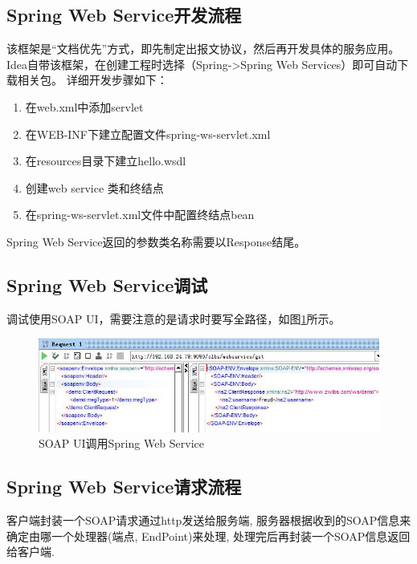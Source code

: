 \documentclass{book}
\begin{document}
\subsection{Spring Web Service开发流程}

该框架是“文档优先”方式，即先制定出报文协议，然后再开发具体的服务应用。
Idea自带该框架，在创建工程时选择（Spring->Spring Web Services）即可自动下载相关包。
详细开发步骤如下：

\begin{enumerate}
	\setcounter{enumi}{0}
	\item{在web.xml中添加servlet}
	\item{在WEB-INF下建立配置文件spring-ws-servlet.xml}
	\item{在resources目录下建立hello.wsdl}
	\item{创建web service 类和终结点}
	\item{在spring-ws-servlet.xml文件中配置终结点bean}
\end{enumerate}

Spring Web Service返回的参数类名称需要以Response结尾。

\subsection{Spring Web Service调试}

调试使用SOAP UI，需要注意的是请求时要写全路径，如图\ref{fig:SoapUIRequest}所示。

\begin{figure}[htbp]
	\centering
	\includegraphics[scale=0.6]{SoapUIRequest.jpg}
	\caption{SOAP UI调用Spring Web Service}
	\label{fig:SoapUIRequest}
\end{figure}

\subsection{Spring Web Service请求流程}

客户端封装一个SOAP请求通过http发送给服务端, 服务器根据收到的SOAP信息来确定由哪一个处理器(端点, EndPoint)来处理, 处理完后再封装一个SOAP信息返回给客户端.
\end{document}
